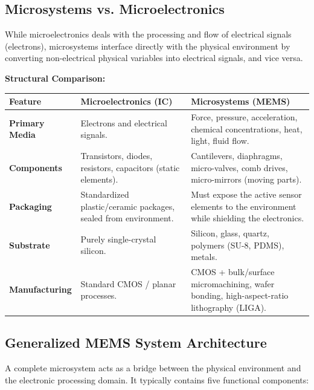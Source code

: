 \documentclass[12pt,a4paper]{article}
\begin{document}
\subsection{Microsystems vs. Microelectronics}
While microelectronics deals with the processing and flow of electrical signals (electrons), microsystems interface directly with the physical environment by converting non-electrical physical variables into electrical signals, and vice versa.

\textbf{Structural Comparison:}\par\noindent
\begin{tabularx}{\linewidth}{|B{3.2cm}|Y|Y|}
\hline
\textbf{Feature} & \textbf{\color{myteal}Microelectronics (IC)} & \textbf{\color{mygreen}Microsystems (MEMS)} \\
\hline
\textbf{Primary Media} & Electrons and electrical signals. & Force, pressure, acceleration, chemical concentrations, heat, light, fluid flow. \\
\hline
\textbf{Components} & Transistors, diodes, resistors, capacitors (static elements). & Cantilevers, diaphragms, micro-valves, comb drives, micro-mirrors (moving parts). \\
\hline
\textbf{Packaging} & Standardized plastic/ceramic packages, sealed from environment. & Must expose the active sensor elements to the environment while shielding the electronics. \\
\hline
\textbf{Substrate} & Purely single-crystal silicon. & Silicon, glass, quartz, polymers (SU-8, PDMS), metals. \\
\hline
\textbf{Manufacturing} & Standard CMOS / planar processes. & CMOS + bulk/surface micromachining, wafer bonding, high-aspect-ratio lithography (LIGA). \\
\hline
\end{tabularx}

\subsection{Generalized MEMS System Architecture}
A complete microsystem acts as a bridge between the physical environment and the electronic processing domain. It typically contains five functional components:
\end{document}
